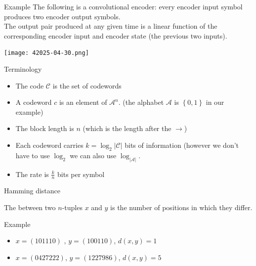 \begin{parag}{Example}
    The following is a convolutional encoder: every encoder input symbol produces two encoder output symbols.\\
    The output pair produced at any given time is a linear function of the corresponding encoder input and encoder state (the previous two inputs).
    \begin{center}
        \texttt{[image: 42025-04-30.png]}
    \end{center}
    

    
\end{parag}
\begin{parag}{Terminology}
    \begin{itemize}
        \item The code $\mathcal{C}$ is the set of codewords 
        \item A codeword $c$ is an element of $\mathcal{A}^n$. (the alphabet $\mathcal{A}$ is $\left\{0, 1\right\}$ in our example)
        \item The block length is $n$  (which is the length after the $\to$)
        \item Each codeword carries $k = \log_2\left|\mathcal{C}\right|$ bits of information (however we don't have to use $\log_2$ we can also use $\log_{\left|\mathcal{A}\right|}$.
        \item The rate is $\frac{k}{n}$ bits per symbol
    \end{itemize}
    
    
\end{parag}
\begin{parag}{Hamming distance}
    \begin{definition}
    The  between two $n$-tuples $x$ and $y$ is the number of positions in which they differ.
    \end{definition}
    \begin{subparag}{Example}
        \begin{itemize}
            \item $x = \left(101110\right)$ ,  $y = \left(100110\right)$, $d\left(x, y\right) = 1$
            \item $x = \left(0427222\right)$, $y = \left(1227986\right)$, $d\left(x, y\right) = 5$
        \end{itemize}
        
        
    \end{subparag}
    
\end{parag}
















